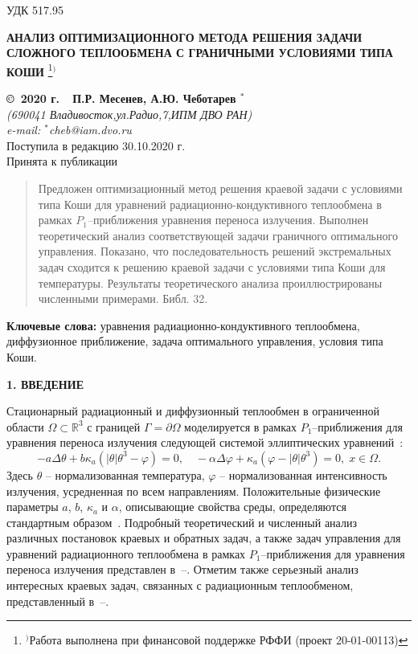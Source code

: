 \documentclass[12pt]{article}
\begin{document}
    УДК 517.95
    \begin{center}
    {\bf АНАЛИЗ ОПТИМИЗАЦИОННОГО МЕТОДА РЕШЕНИЯ ЗАДАЧИ СЛОЖНОГО ТЕПЛООБМЕНА С ГРАНИЧНЫМИ УСЛОВИЯМИ ТИПА КОШИ}
        \footnote[{1}]{$^)$Работа выполнена при финансовой поддержке РФФИ (проект 20-01-00113)}$^)$
    \end{center}
    \begin{center}
    {\bf \copyright\  2020 г.\ \  П.Р. Месенев, А.Ю. Чеботарев $^{*}$}
        \\
        {\it (690041 Владивосток,ул.Радио,7,ИПМ ДВО РАН)\\
        e-mail:  $^{*}$cheb@iam.dvo.ru}\\
        {\small  Поступила в редакцию 30.10.2020 г.\\
        Принята к публикации }
    \end{center}

    \sloppy
    \begin{quote}
        \small
        Предложен оптимизационный метод решения краевой задачи с условиями типа Коши
        для уравнений радиационно-кондуктивного теплообмена в рамках $P_1$--приближения уравнения переноса излучения. Выполнен теоретический анализ соответствующей задачи
        граничного оптимального управления.
        Показано, что последовательность решений экстремальных задач
        сходится к решению краевой задачи с условиями типа Коши для температуры.
        Результаты теоретического анализа проиллюстрированы численными примерами.
        Библ.
        32.
    \end{quote}
    {\bf Ключевые слова:} уравнения радиационно-кондуктивного теплообмена, диффузионное
    приближение, задача оптимального управления, условия типа Коши.

    \begin{center}
        \textbf{1. ВВЕДЕНИЕ}
    \end{center}

    Стационарный радиационный и диффузионный теплообмен в
    ограниченной области $\Omega\subset \mathbb{R}^3$ с границей
    $\Gamma=\partial\Omega$ моделируется в рамках $P_1$--приближения для уравнения
    переноса излучения следующей системой эллиптических уравнений~\cite{Pinnau07,AMC-13,Kovt14-1}:
    \begin{equation}
        \label{eq1}
        - a\Delta\theta + b\kappa_a(|\theta|\theta^3- \varphi)=0,   \quad
        -\alpha \Delta \varphi + \kappa_a(\varphi-|\theta|\theta^3)=0,\; x\in\Omega.
    \end{equation}
    Здесь $\theta$ -- нормализованная температура, $\varphi$ --
    нормализованная интенсивность излучения, усредненная по всем
    направлениям. Положительные физические параметры
    $a$, $b$, $\kappa_a$ и $\alpha$, описывающие
    свойства среды, определяются стандартным образом~\cite{Kovt14-1}.
Подробный теоретический и численный анализ различных постановок краевых и обратных задач, а также задач управления
    для уравнений радиационного теплообмена
    в рамках $P_1$--приближения для уравнения
    переноса излучения представлен в~\cite{Pinnau07}--\cite{CMMP20}.
    Отметим также серьезный анализ интересных краевых задач, связанных с радиационным теплообменом,
    представленный в~\cite{Amosov05}--\cite{Amosov20}.
\end{document}
